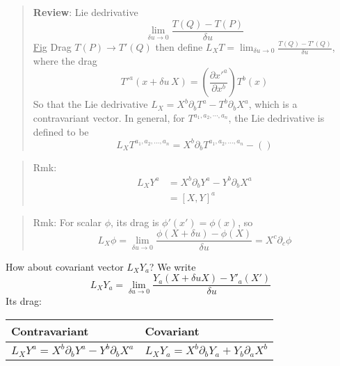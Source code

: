 \begin{quote}
	\textbf{Review}: Lie dedrivative
\begin{equation}
\lim_{\delta u \to 0} \frac{T(Q)-T(P)}{\delta u}
\end{equation}
\underline{Fig}
Drag $T(P)\to T'(Q)$ then define $\displaystyle L_X T = \lim_{\delta u\to 0} \frac{T(Q)-T'(Q)}{\delta u}$, where the drag
\begin{equation}
T'^{a}(x+\delta u\, X) = \left(\frac{\partial x'^{a}}{\partial x^{b}}\right) T^{b}(x)
\end{equation}
So that the Lie dedrivative  $L_X = X^{b}\partial_{b}T^{a} - T^{b}\partial_b X^{a}$, which is a contravariant vector.
In general, for $T^{a_1,a_2,\cdots,a_n}$, the Lie dedrivative is defined to be
\begin{equation}
L_X T^{a_1,a_2,\ldots,a_n} = X^{b}\partial_b T^{a_1,a_2,\ldots,a_n} - \left(\right)
\end{equation}

\end{quote}
\begin{quote}
	Rmk:
\begin{equation}
\begin{aligned}
L_X Y^{a} &= X^{b}\partial_b Y^{a} - Y^{b}\partial_b X^{a}\\
&= [X,Y]^{a}
\end{aligned}
\end{equation}

\end{quote}
\begin{quote}
	Rmk:
For scalar $\phi$, its drag is $\phi'(x') = \phi(x)$, so
\begin{equation}
L_{X} \phi = \lim_{\delta u\to 0}\frac{\phi(X+\delta u) - \phi(X)}{\delta u} = X^{c}\partial_c \phi
\end{equation}

\end{quote}
How about covariant vector $L_XY_a$? We write
\begin{equation}
L_XY_a = \lim_{\delta u\to0}\frac{Y_{a}(X+\delta u X) - Y'_{a}(X')}{\delta u}
\end{equation}
Its drag:










\begin{table}[htbp]
\centering
\begin{tabular}{ll}
\hline
Contravariant & Covariant \\ \hline
$L_X Y^{a} = X^{b}\partial_b Y^{a} - Y^{b}\partial_b X^{a}$ & $L_X Y_{a} = X^{b}\partial_b Y_{a} + Y_{b}\partial_a X^{b}$ \\
\hline
\end{tabular}
\end{table}

